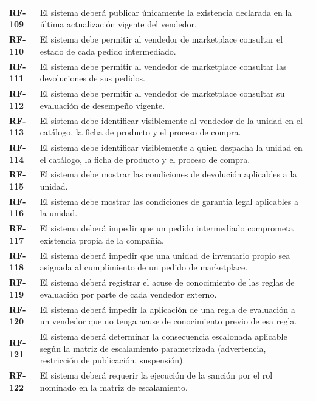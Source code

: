 \documentclass[11pt]{article}
\begin{document}
\begin{longtable}[]{@{}
  >{\raggedright\arraybackslash}p{}
  >{\raggedright\arraybackslash}p{}@{}}
\addlinespace[2pt]
\textbf{RF-109} & El sistema deberá publicar únicamente la existencia declarada en la última actualización vigente del vendedor. \\
\addlinespace[2pt]
\textbf{RF-110} & El sistema debe permitir al vendedor de marketplace consultar el estado de cada pedido intermediado. \\
\addlinespace[2pt]
\textbf{RF-111} & El sistema debe permitir al vendedor de marketplace consultar las devoluciones de sus pedidos. \\
\addlinespace[2pt]
\textbf{RF-112} & El sistema debe permitir al vendedor de marketplace consultar su evaluación de desempeño vigente. \\
\addlinespace[2pt]
\textbf{RF-113} & El sistema debe identificar visiblemente al vendedor de la unidad en el catálogo, la ficha de producto y el proceso de compra. \\
\addlinespace[2pt]
\textbf{RF-114} & El sistema debe identificar visiblemente a quien despacha la unidad en el catálogo, la ficha de producto y el proceso de compra. \\
\addlinespace[2pt]
\textbf{RF-115} & El sistema debe mostrar las condiciones de devolución aplicables a la unidad. \\
\addlinespace[2pt]
\textbf{RF-116} & El sistema debe mostrar las condiciones de garantía legal aplicables a la unidad. \\
\addlinespace[2pt]
\textbf{RF-117} & El sistema deberá impedir que un pedido intermediado comprometa existencia propia de la compañía. \\
\addlinespace[2pt]
\textbf{RF-118} & El sistema deberá impedir que una unidad de inventario propio sea asignada al cumplimiento de un pedido de marketplace. \\
\addlinespace[2pt]
\textbf{RF-119} & El sistema deberá registrar el acuse de conocimiento de las reglas de evaluación por parte de cada vendedor externo. \\
\addlinespace[2pt]
\textbf{RF-120} & El sistema deberá impedir la aplicación de una regla de evaluación a un vendedor que no tenga acuse de conocimiento previo de esa regla. \\
\addlinespace[2pt]
\textbf{RF-121} & El sistema deberá determinar la consecuencia escalonada aplicable según la matriz de escalamiento parametrizada (advertencia, restricción de publicación, suspensión). \\
\addlinespace[2pt]
\textbf{RF-122} & El sistema deberá requerir la ejecución de la sanción por el rol nominado en la matriz de escalamiento. \\

\end{longtable}
\end{document}
